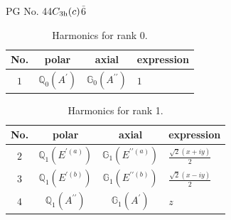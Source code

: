 \documentclass[fleqn,8pt,landscape]{jsarticle}
\begin{document}
\setcounter{MaxMatrixCols}{32}

\renewcommand{\tablename}{Table~}
\renewcommand{\figurename}{Figure~}
\begin{center}
\LARGE
PG No. 44\quad$C_{\rm 3h}(c)$\quad$\bar{6}$\quad[ hexagonal ]
\end{center}
\begin{table}[ht!]
\begin{center}
\caption{Harmonics for rank 0.}
\renewcommand{\arraystretch}{1.3}
\begin{tabular}{cccl} \hline \hline
No. & polar & axial & expression \\ \hline
$ 1 $ & $ \mathbb{Q}_{0}(A^{\prime}) $ & $ \mathbb{G}_{0}(A^{\prime\prime}) $ & $ 1 $ \\
 \hline \hline
\end{tabular}
\end{center}
\end{table}
\begin{table}[ht!]
\begin{center}
\caption{Harmonics for rank 1.}
\renewcommand{\arraystretch}{1.3}
\begin{tabular}{cccl} \hline \hline
No. & polar & axial & expression \\ \hline
$ 2 $ & $ \mathbb{Q}_{1}(E^{\prime(a)}) $ & $ \mathbb{G}_{1}(E^{\prime\prime(a)}) $ & $ \frac{\sqrt{2} \left(x + i y\right)}{2} $ \\
$ 3 $ & $ \mathbb{Q}_{1}(E^{\prime(b)}) $ & $ \mathbb{G}_{1}(E^{\prime\prime(b)}) $ & $ \frac{\sqrt{2} \left(x - i y\right)}{2} $ \\
$ 4 $ & $ \mathbb{Q}_{1}(A^{\prime\prime}) $ & $ \mathbb{G}_{1}(A^{\prime}) $ & $ z $ \\
 \hline \hline
\end{tabular}
\end{center}
\end{table}
\end{document}
